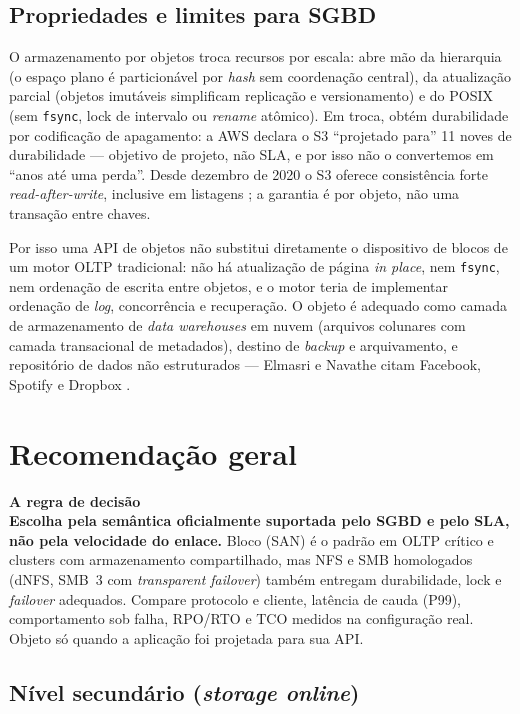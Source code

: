\documentclass[11pt,a4paper]{article}
\newcommand{\destaque}[2]{%
  \begin{center}\begin{minipage}{0.96\textwidth}
  \colorbox{fundo}{\begin{minipage}{\dimexpr\linewidth-2\fboxsep}
  \vspace{2pt}\textbf{\color{azul}\small #1}\\[1pt]\footnotesize #2\vspace{3pt}
  \end{minipage}}\end{minipage}\end{center}}
\begin{document}
\subsection{Propriedades e limites para SGBD}

O armazenamento por objetos troca recursos por escala: abre mão da hierarquia (o espaço plano é
particionável por \textit{hash} sem coordenação central), da atualização parcial (objetos imutáveis
simplificam replicação e versionamento) e do POSIX (sem \texttt{fsync}, lock de intervalo ou
\textit{rename} atômico). Em troca, obtém durabilidade por codificação de apagamento: a AWS declara o S3
``projetado para'' 11 noves de durabilidade \cite{awss3faq} --- objetivo de projeto, não SLA, e por isso
não o convertemos em ``anos até uma perda''. Desde dezembro de 2020 o S3 oferece consistência forte
\textit{read-after-write}, inclusive em listagens \cite{awss3news2020,awss3consistency}; a garantia é por objeto, não uma
transação entre chaves.

Por isso uma API de objetos não substitui diretamente o dispositivo de blocos de um motor OLTP
tradicional: não há atualização de página \textit{in place}, nem \texttt{fsync}, nem ordenação de escrita
entre objetos, e o motor teria de implementar ordenação de \textit{log}, concorrência e recuperação. O
objeto é adequado como camada de armazenamento de \textit{data warehouses} em nuvem (arquivos colunares
com camada transacional de metadados), destino de \textit{backup} e arquivamento, e repositório de dados
não estruturados --- Elmasri e Navathe citam Facebook, Spotify e Dropbox \cite{elmasri2018}.

\section{Recomendação geral}
\label{sec:recomendacao}

\destaque{A regra de decisão}{%
\textbf{Escolha pela semântica oficialmente suportada pelo SGBD e pelo SLA, não pela velocidade do
enlace.} Bloco (SAN) é o padrão em OLTP crítico e clusters com armazenamento compartilhado, mas NFS e SMB
homologados (dNFS, SMB~3 com \textit{transparent failover}) também entregam durabilidade, lock e
\textit{failover} adequados. Compare protocolo e cliente, latência de cauda (P99), comportamento sob
falha, RPO/RTO e TCO medidos na configuração real. Objeto só quando a aplicação foi projetada para sua
API.}

\subsection{Nível secundário (\textit{storage online})}
\label{sec:recsecundario}
\end{document}
